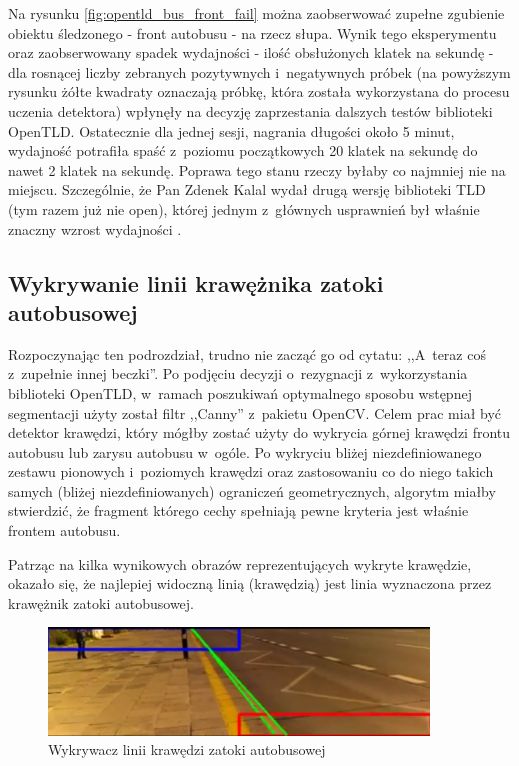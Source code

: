 Na rysunku \ref{fig:opentld_bus_front_fail} można zaobserwować 
zupełne zgubienie obiektu 
śledzonego - 
front autobusu - na rzecz słupa. Wynik tego eksperymentu oraz
zaobserwowany spadek wydajności - ilość obsłużonych klatek na sekundę - 
dla rosnącej liczby zebranych pozytywnych i~negatywnych próbek
(na powyższym rysunku żółte kwadraty oznaczają próbkę, która została
wykorzystana do procesu uczenia detektora) 
wpłynęły na decyzję zaprzestania dalszych testów biblioteki OpenTLD.
Ostatecznie dla jednej sesji,
nagrania długości około 5 minut, wydajność potrafiła spaść z~poziomu
początkowych 20 klatek na sekundę do nawet 2 klatek na sekundę.
Poprawa tego stanu 
rzeczy byłaby co najmniej nie na miejscu. Szczególnie, że Pan 
Zdenek Kalal wydał drugą wersję biblioteki TLD (tym razem już nie 
open), której jednym z~głównych usprawnień był właśnie znaczny 
wzrost wydajności
\cite{WEB:kalaltld2}.

\subsection{Wykrywanie linii krawężnika zatoki autobusowej}

Rozpoczynając ten podrozdział, trudno nie zacząć go od cytatu:
,,A~teraz coś z~zupełnie innej beczki''. Po podjęciu decyzji o~rezygnacji
z~wykorzystania
biblioteki OpenTLD, w~ramach poszukiwań optymalnego sposobu wstępnej
segmentacji użyty został filtr ,,Canny'' z~pakietu OpenCV. Celem prac
miał być detektor krawędzi, który mógłby zostać użyty do
wykrycia górnej krawędzi frontu autobusu lub zarysu autobusu w~ogóle.
Po wykryciu bliżej niezdefiniowanego zestawu pionowych i~poziomych
krawędzi oraz zastosowaniu co do niego takich samych (bliżej
niezdefiniowanych) ograniczeń geometrycznych, algorytm miałby
stwierdzić, że fragment którego cechy spełniają pewne kryteria jest
właśnie frontem autobusu.

Patrząc na kilka wynikowych obrazów reprezentujących wykryte krawędzie,
okazało się, że najlepiej 
widoczną linią (krawędzią) jest linia wyznaczona przez krawężnik
zatoki autobusowej.

\begin{figure}[h!]
    \centering
    \includegraphics[width=0.9\textwidth]{img/exp_bus_lane_edge_detector}
    \caption{Wykrywacz linii krawędzi zatoki autobusowej}
    \label{fig:bus_lane_edge_detection}
\end{figure}

